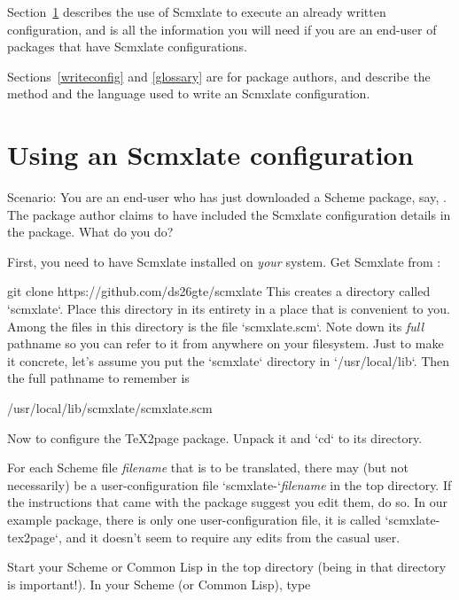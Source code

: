 Section~\ref{useconfig} describes the use of Scmxlate
to execute an already written configuration, and is all
the information you will need if you are an
end-user of packages that have Scmxlate configurations.

Sections~\ref{writeconfig} and \ref{glossary} are for
package authors, and describe the method and the
language used to write an Scmxlate configuration.

\bigbreak


\tableofcontents

\ifx\shipout\totheWeb\else
\vfill\eject
\fi

\section{Using an Scmxlate configuration}
\label{useconfig}

Scenario: You are an end-user who has just downloaded a
Scheme package, say,
.
The package author claims to have included the Scmxlate
configuration details in the package.  What do
you do?

First, you need to have Scmxlate installed on {\em
your} system.  Get Scmxlate from
:

\begintt
git clone https://github.com/ds26gte/scmxlate
\endtt
This creates a directory called `scmxlate`.  Place
this directory in its entirety in a place that is
convenient to you.  Among the files in this directory
is the file `scmxlate.scm`.  Note down
its {\em full} pathname so you can refer to it from
anywhere on your filesystem.
Just to make it concrete, let’s assume you put the
`scmxlate` directory in `/usr/local/lib`.  Then the
full pathname to remember is

\begintt
/usr/local/lib/scmxlate/scmxlate.scm
\endtt

Now to configure the TeX2page package.  Unpack it
and `cd` to its directory.

For each Scheme file {\em filename}  that is to be
translated, there may (but not necessarily) be a
user-configuration file `scmxlate-`{\em filename} in
the top directory.  If the instructions that came with
the package suggest you edit them, do so.  In our
example package, there is only one user-configuration
file, it is called `scmxlate-tex2page`, and it
doesn’t seem to require any edits from the casual user.

Start your Scheme or Common Lisp in the top directory
(being in that directory is important!).  In your
Scheme (or Common Lisp), type

